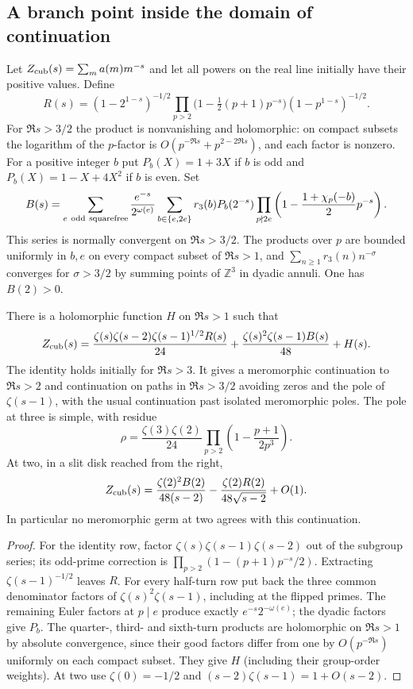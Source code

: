 \subsection*{A branch point inside the domain of continuation}
Let $Z_{\rm cub}(s)=\sum_m a(m)m^{-s}$ and let all powers on the real
line initially have their positive values. Define
\[
 R(s)=(1-2^{1-s})^{-1/2}
 \prod_{p>2}\big(1-\tfrac12(p+1)p^{-s}\big)
                  (1-p^{1-s})^{-1/2}.
\]
For $\Re s>3/2$ the product is nonvanishing and holomorphic:
on compact subsets the logarithm of the $p$-factor is
$O(p^{-\Re s}+p^{2-2\Re s})$, and each factor is nonzero.
For a positive integer $b$ put $P_b(X)=1+3X$ if $b$ is odd and
$P_b(X)=1-X+4X^2$ if $b$ is even. Set
\[
 B(s)=\sum_{e\ {\rm odd\ squarefree}}
 \frac{e^{-s}}{2^{\omega(e)}}\sum_{b\in\{e,2e\}}r_3(b)P_b(2^{-s})
  \prod_{p\nmid 2e}\left(1-\frac{1+\chi_p(-b)}2p^{-s}\right).
\]
This series is normally convergent on $\Re s>3/2$. The products over
$p$ are bounded uniformly in $b,e$ on every compact subset of
$\Re s>1$, and $\sum_{n\ge1}r_3(n)n^{-\sigma}$ converges for
$\sigma>3/2$ by summing points of $\mathbb Z^3$ in dyadic annuli.
One has $B(2)>0$.

\begin{corollary}\label{cor:cubic-boundary}
There is a holomorphic function $H$ on $\Re s>1$ such that
\[
 Z_{\rm cub}(s)=
 \frac{\zeta(s)\zeta(s-2)\zeta(s-1)^{1/2}R(s)}{24}
 +\frac{\zeta(s)^2\zeta(s-1)B(s)}{48}+H(s).
\]
The identity holds initially for $\Re s>3$. It gives a meromorphic
continuation to $\Re s>2$ and continuation on paths in
$\Re s>3/2$ avoiding zeros and the pole of $\zeta(s-1)$, with the
usual continuation past isolated meromorphic poles. The pole at three
is simple, with residue
\[
 \rho=\frac{\zeta(3)\zeta(2)}{24}
     \prod_{p>2}\left(1-\frac{p+1}{2p^3}\right).
\]
At two, in a slit disk reached from the right,
\[
 Z_{\rm cub}(s)=\frac{\zeta(2)^2 B(2)}{48(s-2)}
       -\frac{\zeta(2)R(2)}{48\sqrt{s-2}}+O(1).
\]
In particular no meromorphic germ at two agrees with this continuation.
\end{corollary}
\begin{proof}
For the identity row, factor $\zeta(s)\zeta(s-1)\zeta(s-2)$
out of the subgroup series; its odd-prime correction is
$\prod_{p>2}(1-(p+1)p^{-s}/2)$.
Extracting $\zeta(s-1)^{-1/2}$ leaves $R$.
For every half-turn row put back the three common denominator factors
of $\zeta(s)^2\zeta(s-1)$, including at the flipped primes. The remaining
Euler factors at $p\mid e$ produce exactly $e^{-s}2^{-\omega(e)}$;
the dyadic factors give $P_b$. The quarter-, third- and sixth-turn
products are holomorphic on $\Re s>1$ by absolute convergence, since
their good factors differ from one by $O(p^{-\Re s})$ uniformly on
each compact subset. They give $H$ (including their group-order
weights). At two use $\zeta(0)=-1/2$ and
$(s-2)\zeta(s-1)=1+O(s-2)$.
\end{proof}

